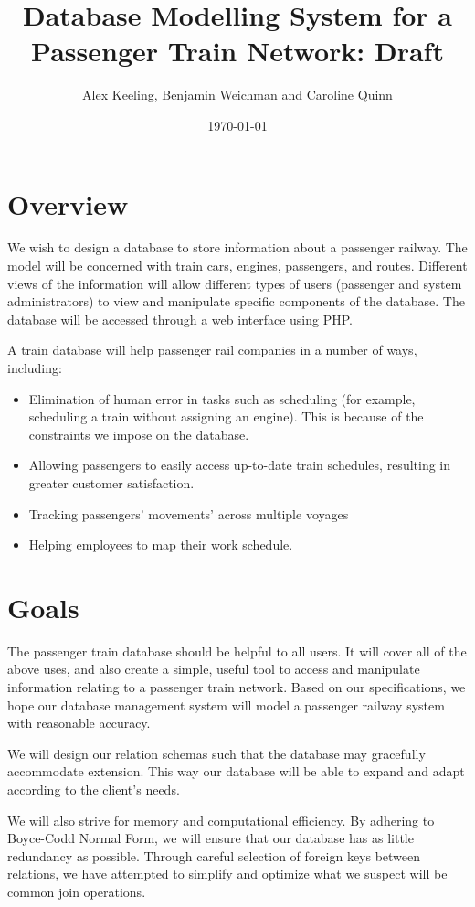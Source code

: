 \documentclass[a4paper]{article}
\title{Database Modelling System for a Passenger Train Network: Draft}
\author{Alex Keeling, Benjamin Weichman and Caroline Quinn}
\date{\today}
\begin{document}
\maketitle


\section{Overview}
We wish to design a database to store information about a passenger railway. The model will be concerned with train cars, engines, passengers, and routes. Different views of the information will allow different types of users (passenger and system administrators) to view and manipulate specific components of the database. The database will be accessed through a web interface using PHP. 

A train database will help passenger rail companies in a number of ways, including:

\begin{itemize}
\item{Elimination of human error in tasks such as scheduling (for example, scheduling a train without assigning an engine). This is because of the constraints we impose on the database.}
\item{Allowing passengers to easily access up-to-date train schedules, resulting in greater customer satisfaction. }
\item{Tracking passengers’ movements’ across multiple voyages}
\item{Helping employees to map their work schedule.}
\end{itemize}


\section{Goals}
The passenger train database should be helpful to all users. It will cover all of the above uses, and also create a simple, useful tool to access and manipulate information relating to a passenger train network. Based on our specifications, we hope our database management system will model a passenger railway system with reasonable accuracy. 

We will design our relation schemas such that the database may gracefully accommodate extension. This way our database will be able to expand and adapt according to the client’s needs. 

We will also strive for memory and computational efficiency. By adhering to Boyce-Codd Normal Form, we will ensure that our database has as little redundancy as possible. Through careful selection of foreign keys between relations, we have attempted to simplify and optimize what we suspect will be common join operations.
\end{document}
